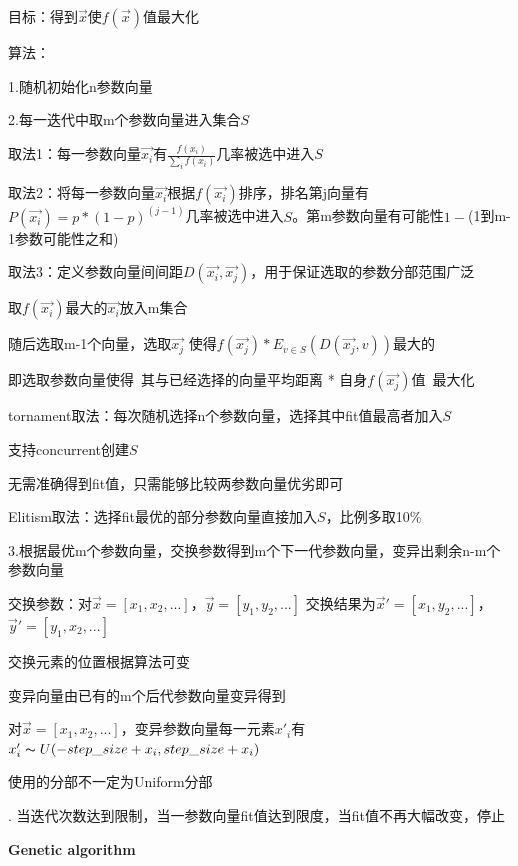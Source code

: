 \documentclass[UTF8]{ctexart}
\begin{document}
  目标：得到$\vec{x}$使$f(\vec{x})$值最大化

  算法：

  \quad 1.随机初始化n参数向量

  \quad 2.每一迭代中取m个参数向量进入集合$S$

  \quad \quad 取法1：每一参数向量$\vec{x_i}$有$\frac{f(x_i)}{\sum_i f(x_i)}$几率被选中进入$S$

  \quad \quad 取法2：将每一参数向量$\vec{x_i}$根据$f(\vec{x_i})$排序，排名第j向量有$P(\vec{x_i}) = p * (1-p)^(j-1)$几率被选中进入$S$。第m参数向量有可能性$1-$(1到m-1参数可能性之和)

  \quad \quad 取法3：定义参数向量间间距$D(\vec{x_i}, \vec{x_j})$，用于保证选取的参数分部范围广泛

  \quad \quad \quad 取$f(\vec{x_i})$最大的$\vec{x_i}$放入m集合

  \quad \quad \quad 随后选取m-1个向量，选取$\vec{x_j}$ 使得$f(\vec{x_j}) * E_{v \in S}(D(\vec{x_j}, v))$最大的

  \quad \quad \quad 即选取参数向量使得\ 其与已经选择的向量平均距离 * 自身$f(\vec{x_j})$值\ 最大化

  \quad \quad tornament取法：每次随机选择n个参数向量，选择其中fit值最高者加入$S$

  \quad \quad \quad 支持concurrent创建$S$

  \quad \quad \quad 无需准确得到fit值，只需能够比较两参数向量优劣即可

  \quad \quad Elitism取法：选择fit最优的部分参数向量直接加入$S$，比例多取10\%

  \quad \quad \quad 

  \quad 3.根据最优m个参数向量，交换参数得到m个下一代参数向量，变异出剩余n-m个参数向量

  \quad \quad 交换参数：对$\vec{x} = [x_1, x_2, ...]$，$\vec{y} = [y_1, y_2, ...]$ 交换结果为$\vec{x}' = [x_1, y_2, ...]$，$\vec{y}' = [y_1, x_2, ...]$

  \quad \quad \quad 交换元素的位置根据算法可变

  \quad \quad 变异向量由已有的m个后代参数向量变异得到

  \quad \quad \quad 对$\vec{x} = [x_1, x_2, ...]$，变异参数向量每一元素$x'_i$有$x'_i \thicksim U(-step\_size + x_i, step\_size + x_i)$

  \quad \quad \quad 使用的分部不一定为Uniform分部

  . 当迭代次数达到限制，当一参数向量fit值达到限度，当fit值不再大幅改变，停止

  \textbf{Genetic algorithm}
  
\end{document}
